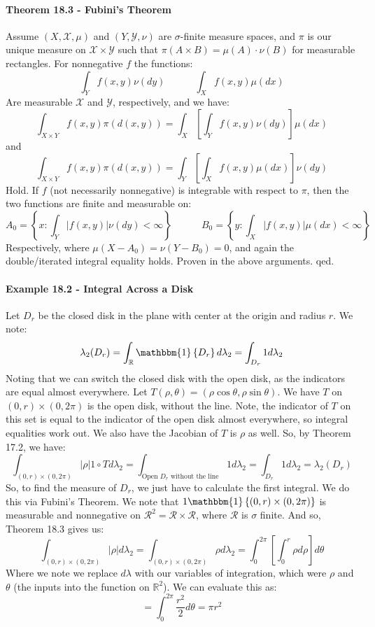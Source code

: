 \documentclass[12pt,a4paper]{article}
\newcommand{\1}[1]{\mathbbm{1}\left\{ #1 \right\}}
\newcommand{\R}{\mathbb{R}}
\newcommand{\rcal}{\mathcal{R}}
\newcommand{\xcal}{\mathcal{X}}
\newcommand{\ycal}{\mathcal{Y}}
\begin{document}
\paragraph{Theorem 18.3 - Fubini's Theorem} Assume $(X, \xcal, \mu)$ and $(Y, \ycal, \nu)$ are $\sigma$-finite measure spaces, and $\pi$ is our unique measure on $\xcal \times \ycal$ such that $\pi(A \times B) = \mu(A) \cdot \nu(B)$ for measurable rectangles. For nonnegative $f$ the functions:
$$
	\int_Y f(x,y) \nu(dy) \quad\quad\quad
	\int_X f(x,y) \mu(dx)
$$
Are measurable $\xcal$ and $\ycal$, respectively, and we have:
$$
	\int_{X \times Y} f(x,y) \pi(d(x,y)) = \int_X \left[\int_Y f(x,y) \nu(dy)\right] \mu(dx)
$$
and
$$
	\int_{X \times Y} f(x,y) \pi(d(x,y)) = \int_Y \left[\int_X f(x,y) \mu(dx)\right] \nu(dy)
$$
Hold. If $f$ (not necessarily nonnegative) is integrable with respect to $\pi$, then the two functions are finite and measurable on:
$$
	A_0 = \left\{x : \int_Y |f(x,y)| \nu(dy) < \infty\right\} \quad\quad\quad
	B_0 = \left\{y : \int_X |f(x,y)| \mu(dx) < \infty\right\}
$$
Respectively, where $\mu(X - A_0) = \nu(Y - B_0) = 0$, and again the double/iterated integral equality holds. Proven in the above arguments. qed.

\paragraph{Example 18.2 - Integral Across a Disk} Let $D_r$ be the closed disk in the plane with center at the origin and radius $r$. We note:
$$
	\lambda_2(D_r) =
	\int_\R \1{D_r} d\lambda_2 =
	\int_{D_r} 1 d\lambda_2
$$
Noting that we can switch the closed disk with the open disk, as the indicators are equal almost everywhere. Let $T(\rho, \theta) = (\rho \cos \theta, \rho \sin \theta)$. We have $T$ on $(0, r) \times (0,2\pi)$ is the open disk, without the line. Note, the indicator of $T$ on this set is equal to the indicator of the open disk almost everywhere, so integral equalities work out. We also have the Jacobian of $T$ is $\rho$ as well. So, by Theorem 17.2, we have:
$$
	\int_{(0, r) \times (0,2\pi)} |\rho| 1 \circ T d\lambda_2 =
	\int_{\text{Open $D_r$ without the line}} 1 d\lambda_2 =
	\int_{D_r} 1 d\lambda_2 =
	\lambda_2(D_r)
$$
So, to find the measure of $D_r$, we just have to calculate the first integral. We do this via Fubini's Theorem. We note that $1 \1{(0, r) \times (0,2\pi)}$ is measurable and nonnegative on $\rcal^2 = \rcal \times \rcal$, where $\rcal$ is $\sigma$ finite. And so, Theorem 18.3 gives us:
$$
	\int_{(0, r) \times (0,2\pi)} |\rho| d\lambda_2 =
	\int_{(0, r) \times (0,2\pi)} \rho d\lambda_2 =
	\int_0^{2\pi} \left[\int_0^r \rho d\rho\right] d\theta
$$
Where we note we replace $d\lambda$ with our variables of integration, which were $\rho$ and $\theta$ (the inputs into the function on $\R^2$). We can evaluate this as:
$$
	=
	\int_0^{2\pi} \frac{r^2}{2} d\theta = \pi r^2
$$
\end{document}

